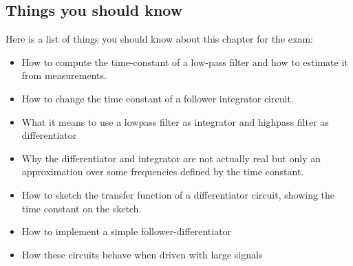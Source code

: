 \subsection{Things you should know}

Here is a list of things you should know about this chapter for the exam: 

\begin{itemize}
    \item How to compute the time-constant of a low-pass filter and how to estimate it from measurements.
    \item How to change the time constant of a follower integrator circuit.
    \item What it means to use a lowpass filter as integrator and highpass filter as differentiator
    \item Why the differentiator and integrator are not actually real but only an approximation over some frequencies defined by the time constant.
    \item How to sketch the transfer function of a differentiator circuit, showing the time constant on the sketch. 
    \item How to implement a simple follower-differentiator
    \item How these circuits behave when driven with large signals
\end{itemize}
